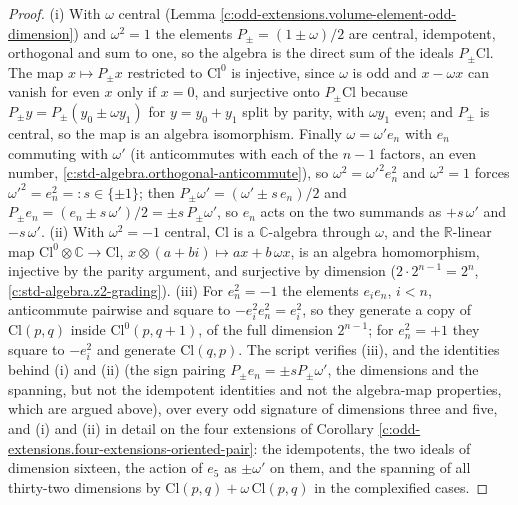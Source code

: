 \documentclass[11pt]{article}
\theoremstyle{definition}
\theoremstyle{plain}
\providecommand{\C}{}\renewcommand{\C}{\mathbb{C}}
\providecommand{\Cl}{}\renewcommand{\Cl}{\mathrm{Cl}}
\providecommand{\R}{}\renewcommand{\R}{\mathbb{R}}
\begin{document}
\begin{proof}
(i) With $\omega$ central (Lemma \ref{c:odd-extensions.volume-element-odd-dimension}) and $\omega^{2} = 1$ the elements $P_{\pm} = (1 \pm \omega)/2$ are central, idempotent, orthogonal and sum to one, so the algebra is the direct sum of the ideals $P_{\pm}\Cl$. The map $x \mapsto P_{\pm}x$ restricted to $\Cl^{0}$ is injective, since $\omega$ is odd and $x - \omega x$ can vanish for even $x$ only if $x = 0$, and surjective onto $P_{\pm}\Cl$ because $P_{\pm}y = P_{\pm}(y_{0} \pm \omega y_{1})$ for $y = y_{0} + y_{1}$ split by parity, with $\omega y_{1}$ even; and $P_{\pm}$ is central, so the map is an algebra isomorphism. Finally $\omega = \omega' e_{n}$ with $e_{n}$ commuting with $\omega'$ (it anticommutes with each of the $n - 1$ factors, an even number, \ref{c:std-algebra.orthogonal-anticommute}), so $\omega^{2} = \omega'^{2}e_{n}^{2}$ and $\omega^{2} = 1$ forces $\omega'^{2} = e_{n}^{2} =: s \in \{\pm 1\}$; then $P_{\pm}\omega' = (\omega' \pm s\,e_{n})/2$ and $P_{\pm}e_{n} = (e_{n} \pm s\,\omega')/2 = \pm s\,P_{\pm}\omega'$, so $e_{n}$ acts on the two summands as $+s\,\omega'$ and $-s\,\omega'$. (ii) With $\omega^{2} = -1$ central, $\Cl$ is a $\C$-algebra through $\omega$, and the $\R$-linear map $\Cl^{0} \otimes \C \to \Cl$, $x \otimes (a + bi) \mapsto ax + b\,\omega x$, is an algebra homomorphism, injective by the parity argument, and surjective by dimension ($2 \cdot 2^{n-1} = 2^{n}$, \ref{c:std-algebra.z2-grading}). (iii) For $e_{n}^{2} = -1$ the elements $e_{i}e_{n}$, $i < n$, anticommute pairwise and square to $-e_{i}^{2}e_{n}^{2} = e_{i}^{2}$, so they generate a copy of $\Cl(p,q)$ inside $\Cl^{0}(p, q+1)$, of the full dimension $2^{n-1}$; for $e_{n}^{2} = +1$ they square to $-e_{i}^{2}$ and generate $\Cl(q,p)$. The script verifies (iii), and the identities behind (i) and (ii) (the sign pairing $P_{\pm}e_{n} = \pm s P_{\pm}\omega'$, the dimensions and the spanning, but not the idempotent identities and not the algebra-map properties, which are argued above), over every odd signature of dimensions three and five, and (i) and (ii) in detail on the four extensions of Corollary \ref{c:odd-extensions.four-extensions-oriented-pair}: the idempotents, the two ideals of dimension sixteen, the action of $e_{5}$ as $\pm\omega'$ on them, and the spanning of all thirty-two dimensions by $\Cl(p,q) + \omega\,\Cl(p,q)$ in the complexified cases.

\end{proof}
\end{document}
